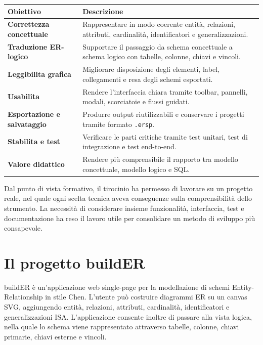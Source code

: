 \documentclass{unipd-thesis-modern}
\newcommand{\builder}{buildER}
\begin{document}
\begin{table}[htbp]
\centering
\small
\begin{tabularx}{\textwidth}{>{\bfseries}p{3.5cm}X}
\toprule
Obiettivo & Descrizione \\
\midrule
Correttezza concettuale & Rappresentare in modo coerente entità, relazioni, attributi, cardinalità, identificatori e generalizzazioni. \\
Traduzione ER-logico & Supportare il passaggio da schema concettuale a schema logico con tabelle, colonne, chiavi e vincoli. \\
Leggibilita grafica & Migliorare disposizione degli elementi, label, collegamenti e resa degli schemi esportati. \\
Usabilita & Rendere l'interfaccia chiara tramite toolbar, pannelli, modali, scorciatoie e flussi guidati. \\
Esportazione e salvataggio & Produrre output riutilizzabili e conservare i progetti tramite formato \texttt{.ersp}. \\
Stabilita e test & Verificare le parti critiche tramite test unitari, test di integrazione e test end-to-end. \\
Valore didattico & Rendere più comprensibile il rapporto tra modello concettuale, modello logico e SQL. \\
\bottomrule
\end{tabularx}
\end{table}

Dal punto di vista formativo, il tirocinio ha permesso di lavorare su un progetto reale, nel quale ogni scelta tecnica aveva conseguenze sulla comprensibilità dello strumento. La necessità di considerare insieme funzionalità, interfaccia, test e documentazione ha reso il lavoro utile per consolidare un metodo di sviluppo più consapevole.

\chapter{Il progetto \builder}

\builder{} è un'applicazione web single-page per la modellazione di schemi Entity-Relationship in stile Chen. L'utente può costruire diagrammi ER su un canvas SVG, aggiungendo entità, relazioni, attributi, cardinalità, identificatori e generalizzazioni ISA. L'applicazione consente inoltre di passare alla vista logica, nella quale lo schema viene rappresentato attraverso tabelle, colonne, chiavi primarie, chiavi esterne e vincoli.
\end{document}
